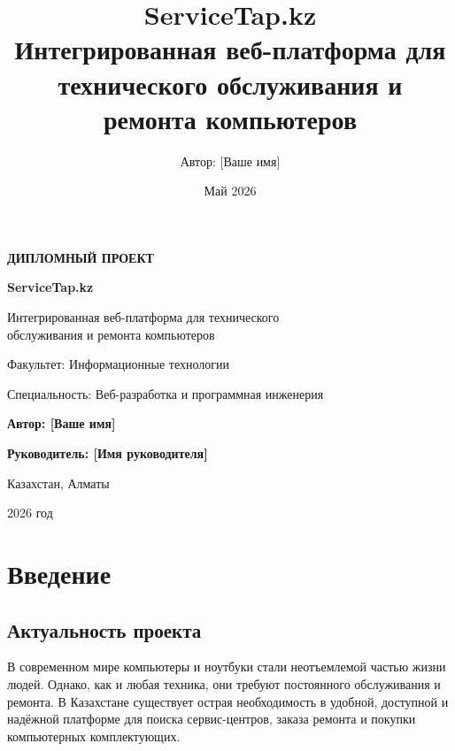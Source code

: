 \documentclass[12pt,a4paper]{report}
\title{
    \textbf{ServiceTap.kz}\\
    \large Интегрированная веб-платформа для\\
    технического обслуживания и ремонта компьютеров
}
\author{Автор: [Ваше имя]}
\date{Май 2026}
\begin{document}
\begin{titlepage}
    \centering
    \vspace*{1cm}
    {\Large\bfseries ДИПЛОМНЫЙ ПРОЕКТ\par}
    \vspace{1cm}
    {\Huge\bfseries ServiceTap.kz\par}
    \vspace{0.5cm}
    {\Large Интегрированная веб-платформа для технического\\
    обслуживания и ремонта компьютеров\par}
    \vspace{2cm}
    {\large Факультет: Информационные технологии\par}
    \vspace{0.5cm}
    {\large Специальность: Веб-разработка и программная инженерия\par}
    \vspace{3cm}
    {\large\bfseries Автор: [Ваше имя]\par}
    \vspace{1cm}
    {\large\bfseries Руководитель: [Имя руководителя]\par}
    \vspace{3cm}
    {\large Казахстан, Алматы\par}
    \vspace{0.5cm}
    {\large 2026 год\par}
\end{titlepage}

\newpage

\tableofcontents
\newpage

\chapter{Введение}

\section{Актуальность проекта}
В современном мире компьютеры и ноутбуки стали неотъемлемой частью жизни людей. Однако, как и любая техника, они требуют постоянного обслуживания и ремонта. В Казахстане существует острая необходимость в удобной, доступной и надёжной платформе для поиска сервис-центров, заказа ремонта и покупки компьютерных комплектующих.
\end{document}
